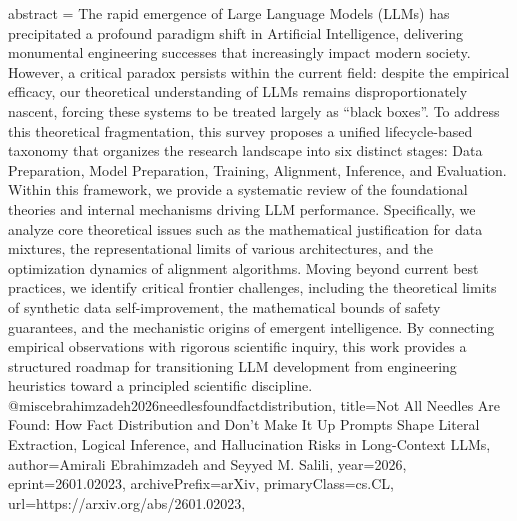 {      abstract = {The rapid emergence of Large Language Models (LLMs) has precipitated a profound paradigm shift in Artificial Intelligence, delivering monumental engineering successes that increasingly impact modern society. However, a critical paradox persists within the current field: despite the empirical efficacy, our theoretical understanding of LLMs remains disproportionately nascent, forcing these systems to be treated largely as ``black boxes''. To address this theoretical fragmentation, this survey proposes a unified lifecycle-based taxonomy that organizes the research landscape into six distinct stages: Data Preparation, Model Preparation, Training, Alignment, Inference, and Evaluation. Within this framework, we provide a systematic review of the foundational theories and internal mechanisms driving LLM performance. Specifically, we analyze core theoretical issues such as the mathematical justification for data mixtures, the representational limits of various architectures, and the optimization dynamics of alignment algorithms. Moving beyond current best practices, we identify critical frontier challenges, including the theoretical limits of synthetic data self-improvement, the mathematical bounds of safety guarantees, and the mechanistic origins of emergent intelligence. By connecting empirical observations with rigorous scientific inquiry, this work provides a structured roadmap for transitioning LLM development from engineering heuristics toward a principled scientific discipline.}
}@misc{ebrahimzadeh2026needlesfoundfactdistribution,
      title={Not All Needles Are Found: How Fact Distribution and Don't Make It Up Prompts Shape Literal Extraction, Logical Inference, and Hallucination Risks in Long-Context LLMs}, 
      author={Amirali Ebrahimzadeh and Seyyed M. Salili},
      year={2026},
      eprint={2601.02023},
      archivePrefix={arXiv},
      primaryClass={cs.CL},
      url={https://arxiv.org/abs/2601.02023},
}
